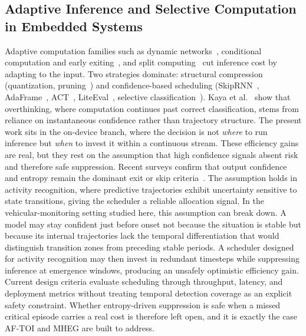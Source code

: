\documentclass[a4paper,fleqn]{cas-dc}
\newcommand{\AFTOI}{\mbox{AF-TOI}\xspace}
\newcommand{\MHEG}{\mbox{MHEG}\xspace}
\begin{document}
\subsection{Adaptive Inference and Selective Computation in Embedded Systems}
\label{sec:rel_edgeai}
Adaptive computation families such as dynamic networks~\cite{han2022dynamic,montello2025dynamic}, conditional computation and early exiting~\cite{scardapane2024conditional,rahmath2024earlyexit,teerapittayanon2016branchynet,laskaridis2021adaptive}, and split computing~\cite{matsubara2022split,laskaridis2020hapi} cut inference cost by adapting to the input. Two strategies dominate: structural compression (quantization, pruning~\cite{hariharan2023driveredge}) and confidence-based scheduling (SkipRNN~\cite{campos2018skip}, AdaFrame~\cite{wu2019adaframe}, ACT~\cite{graves2016adaptive}, LiteEval~\cite{wu2019liteeval}, selective classification~\cite{geifman2017selective}). Kaya et al.~\cite{kaya2019shallow} show that overthinking, where computation continues past correct classification, stems from reliance on instantaneous confidence rather than trajectory structure. The present work sits in the on-device branch, where the decision is not \emph{where} to run inference but \emph{when} to invest it within a continuous stream.
These efficiency gains are real, but they rest on the assumption that high
confidence signals absent risk and therefore safe suppression. Recent surveys
confirm that output confidence and entropy remain the dominant exit or skip
criteria~\cite{rahmath2024earlyexit}. The assumption holds in activity
recognition, where predictive trajectories exhibit uncertainty sensitive to
state transitions, giving the scheduler a reliable allocation signal.
{\color{\revcolor}In the vehicular-monitoring setting studied here, this assumption can break down.} A model may stay confident
just before onset not because the situation is stable but because its internal
trajectories lack the temporal differentiation that would distinguish
transition zones from preceding stable periods. A scheduler designed for
activity recognition may then invest in redundant timesteps while suppressing
inference at emergence windows, producing an unsafely optimistic efficiency
gain. Current design criteria evaluate scheduling through throughput, latency,
and deployment metrics without treating temporal detection coverage as an
explicit safety constraint. Whether entropy-driven suppression is safe when a
missed critical episode carries a real cost is therefore left open, and it is
exactly the case \AFTOI and \MHEG are built to address.
\end{document}

